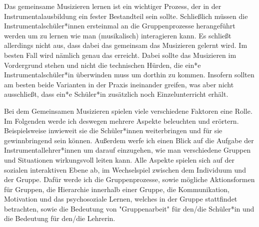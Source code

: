 
Das gemeinsame Musizieren lernen ist ein wichtiger Prozess, der in der
Instrumentalausbildung ein fester Bestandteil sein sollte. Schließlich müssen
die Instrumentalschüler*innen ersteinmal an die Gruppenprozesse herangeführt werden um
zu lernen wie man (musikalisch) interagieren kann. Es schließt allerdings nicht
aus, dass dabei das gemeinsam das Musizieren gelernt wird. Im besten Fall wird nämlich
genau das erreicht. Dabei sollte das Musizieren im Vordergrund stehen und nicht
die technischen Hürden, die ein*e Instrumentalschüler*in überwinden muss um dorthin
zu kommen. Insofern sollten am besten beide Varianten in der Praxis ineinander
greifen, was aber nicht ausschließt, dass ein*e Schüler*in zusätzlich noch
Einzelunterricht erhält.

Bei dem Gemeinsamen Musizieren spielen viele verschiedene Faktoren eine Rolle.
Im Folgenden werde ich deswegen mehrere Aspekte beleuchten und erörtern.
Beispielsweise
inwieweit sie die Schüler*innen weiterbringen und für sie gewinnbringend sein
können. Außerdem werfe ich einen Blick auf die Aufgabe der
Instrumentallehrer*innen um darauf einzugehen, wie man verschiedene Gruppen und
Situationen wirkungsvoll leiten kann. Alle Aspekte spielen sich auf der sozialen
interaktiven Ebene ab, im Wechselspiel zwischen dem Individuum und der Gruppe.
Dafür werde ich die Gruppenprozesse, sowie mögliche
Aktionsformen für Gruppen, die Hierarchie innerhalb einer Gruppe, die
Kommunikation, Motivation und das psychosoziale Lernen, welches in der Gruppe
stattfindet betrachten, sowie die Bedeutung von "Gruppenarbeit" für den/die
Schüler*in und die Bedeutung für den/die Lehrerin.






























